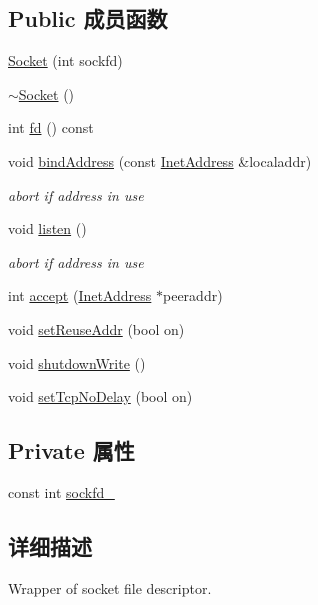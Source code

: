 \subsection*{Public 成员函数}
\begin{DoxyCompactItemize}
\item 
\hyperlink{classmuduo_1_1Socket_ad649516e0d40b6d9485a8218125414a4}{Socket} (int sockfd)
\item 
\hyperlink{classmuduo_1_1Socket_af387aca495ea9a25c511cd7d02d997bb}{$\sim$\+Socket} ()
\item 
int \hyperlink{classmuduo_1_1Socket_ace5c4071ee8893901bb818bbcab739b2}{fd} () const
\item 
void \hyperlink{classmuduo_1_1Socket_a5676ae95e49d9927ccf9cf7255521689}{bind\+Address} (const \hyperlink{classmuduo_1_1InetAddress}{Inet\+Address} \&localaddr)
\begin{DoxyCompactList}\small\item\em abort if address in use \end{DoxyCompactList}\item 
void \hyperlink{classmuduo_1_1Socket_a458bbe4cf81360301586b2e62a7f9dd2}{listen} ()
\begin{DoxyCompactList}\small\item\em abort if address in use \end{DoxyCompactList}\item 
int \hyperlink{classmuduo_1_1Socket_a4f91f07f92cd51f6d6d4214af1e9b73f}{accept} (\hyperlink{classmuduo_1_1InetAddress}{Inet\+Address} $\ast$peeraddr)
\item 
void \hyperlink{classmuduo_1_1Socket_add291e612aa85998f66e8dd002a942ff}{set\+Reuse\+Addr} (bool on)
\item 
void \hyperlink{classmuduo_1_1Socket_a214a4d8c48e77393446932b95ebdf306}{shutdown\+Write} ()
\item 
void \hyperlink{classmuduo_1_1Socket_a7419d5072b837a2ba3cc5aac85015212}{set\+Tcp\+No\+Delay} (bool on)
\end{DoxyCompactItemize}
\subsection*{Private 属性}
\begin{DoxyCompactItemize}
\item 
const int \hyperlink{classmuduo_1_1Socket_ad56487222e0d1634d397b788af212ffa}{sockfd\+\_\+}
\end{DoxyCompactItemize}


\subsection{详细描述}
Wrapper of socket file descriptor.


